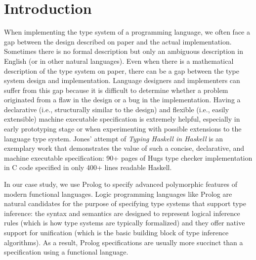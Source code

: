 \section{Introduction}\label{sec:intro}
When implementing the type system of a programming language,
we often face a gap between the design described on paper and
the actual implementation. Sometimes there is no formal description
but only an ambiguous description in English (or in other natural languages).
Even when there is a mathematical description of the type system on paper,
there can be a gap between the type system design and implementation.
Language designers and implementers can suffer from this gap because
it is difficult to determine whether a problem originated from a flaw
in the design or a bug in the implementation. Having a declarative
(i.e., structurally similar to the design)
and flexible (i.e., easily extensible) machine executable specification
is extremely helpful, especially in early prototyping stage or
when experimenting with possible extensions to the language type system.  
Jones' attempt of \emph{Typing Haskell in Haskell} \cite{JonesTHiH99} is
an exemplary work that demonstrates the value of such a concise, declarative,
and machine executable specification:
90+ pages of Hugs type checker implementation in C code specified in
only 400+ lines readable Haskell.

In our case study, we use Prolog to specify advanced polymorphic features of
modern functional languages. Logic programming languages like Prolog
are natural candidates for the purpose of specifying type systems
that support type inference: the syntax and semantics are
designed to represent logical inference rules (which is how type systems
are typically formalized) and they offer native support for unification (which
is the basic building block of type inference algorithms). As a result,
Prolog specifications are usually more succinct than a specification
using a functional language.

